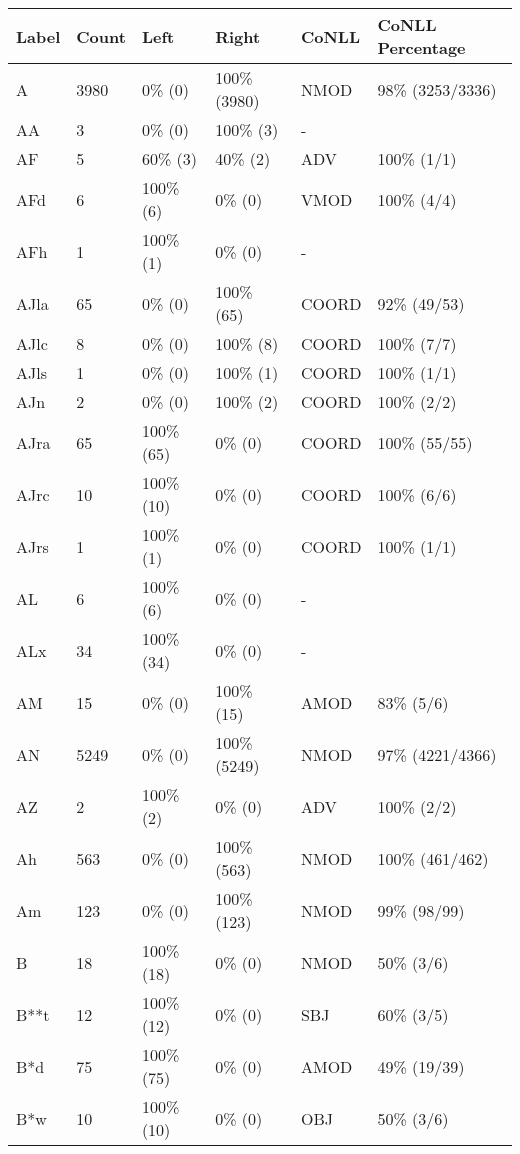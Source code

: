 \begin{figure*}
\begin{tabular}{|l|l|l|l||l|l|}
\hline
Label & Count & Left & Right & CoNLL & CoNLL Percentage\\ 
\hline
 A & 3980 & 0\% (0) & 100\% (3980) & NMOD & 98\% (3253/3336) \\ 
\hline
 AA & 3 & 0\% (0) & 100\% (3) & - &  \\ 
\hline
 AF & 5 & 60\% (3) & 40\% (2) & ADV & 100\% (1/1) \\ 
\hline
 AFd & 6 & 100\% (6) & 0\% (0) & VMOD & 100\% (4/4) \\ 
\hline
 AFh & 1 & 100\% (1) & 0\% (0) & - &  \\ 
\hline
 AJla & 65 & 0\% (0) & 100\% (65) & COORD & 92\% (49/53) \\ 
\hline
 AJlc & 8 & 0\% (0) & 100\% (8) & COORD & 100\% (7/7) \\ 
\hline
 AJls & 1 & 0\% (0) & 100\% (1) & COORD & 100\% (1/1) \\ 
\hline
 AJn & 2 & 0\% (0) & 100\% (2) & COORD & 100\% (2/2) \\ 
\hline
 AJra & 65 & 100\% (65) & 0\% (0) & COORD & 100\% (55/55) \\ 
\hline
 AJrc & 10 & 100\% (10) & 0\% (0) & COORD & 100\% (6/6) \\ 
\hline
 AJrs & 1 & 100\% (1) & 0\% (0) & COORD & 100\% (1/1) \\ 
\hline
 AL & 6 & 100\% (6) & 0\% (0) & - &  \\ 
\hline
 ALx & 34 & 100\% (34) & 0\% (0) & - &  \\ 
\hline
 AM & 15 & 0\% (0) & 100\% (15) & AMOD & 83\% (5/6) \\ 
\hline
 AN & 5249 & 0\% (0) & 100\% (5249) & NMOD & 97\% (4221/4366) \\ 
\hline
 AZ & 2 & 100\% (2) & 0\% (0) & ADV & 100\% (2/2) \\ 
\hline
 Ah & 563 & 0\% (0) & 100\% (563) & NMOD & 100\% (461/462) \\ 
\hline
 Am & 123 & 0\% (0) & 100\% (123) & NMOD & 99\% (98/99) \\ 
\hline
 B & 18 & 100\% (18) & 0\% (0) & NMOD & 50\% (3/6) \\ 
\hline
 B**t & 12 & 100\% (12) & 0\% (0) & SBJ & 60\% (3/5) \\ 
\hline
 B*d & 75 & 100\% (75) & 0\% (0) & AMOD & 49\% (19/39) \\ 
\hline
 B*w & 10 & 100\% (10) & 0\% (0) & OBJ & 50\% (3/6) \\ 
\hline

\end{tabular}
\end{figure*}
